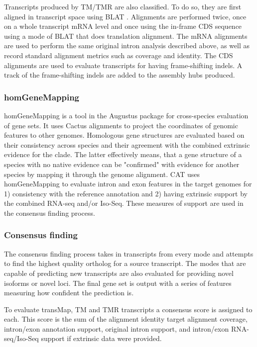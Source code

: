 \documentclass[fleqn,10pt]{wlscirep}
\begin{document}
	Transcripts produced by TM/TMR are also classified. To do so, they are first aligned in transcript space using BLAT \cite{kent2002blat}. Alignments are performed twice, once on a whole transcript mRNA level and once using the in-frame CDS sequence using a mode of BLAT that does translation alignment. The mRNA alignments are used to perform the same original intron analysis described above, as well as record standard alignment metrics such as coverage and identity. The CDS alignments are used to evaluate transcripts for having frame-shifting indels. A track of the frame-shifting indels are added to the assembly hubs produced.

\subsubsection*{homGeneMapping}
	homGeneMapping is a tool in the Augustus package for cross-species evaluation of gene sets. It uses Cactus alignments to project the coordinates of genomic features to other genomes. Homologous gene structures are evaluated based on their consistency across species and their agreement with the combined extrinsic evidence for the clade. The latter effectively means, that a gene structure of a species with no native evidence can be "confirmed" with evidence for another species by mapping it through the genome alignment. CAT uses homGeneMapping to evaluate intron and exon features in the target genomes for 1) consistency with the reference annotation and 2) having extrinsic support by the combined RNA-seq and/or Iso-Seq. These measures of support are used in the consensus finding process.

\subsubsection*{Consensus finding}
	The consensus finding process takes in transcripts from every mode and attempts to find the highest quality ortholog for a source transcript. The modes that are capable of predicting new transcripts are also evaluated for providing novel isoforms or novel loci. The final gene set is output with a series of features measuring how confident the prediction is.
  
	To evaluate transMap, TM and TMR transcripts a consensus score is assigned to each. This score is the sum of the alignment identity target alignment coverage, intron/exon annotation support, original intron support, and intron/exon RNA-seq/Iso-Seq support if extrinsic data were provided.
  
\end{document}
